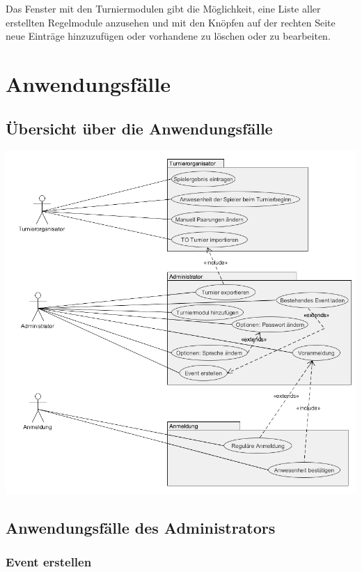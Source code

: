 \documentclass[11pt]{article}
\begin{document}
\vspace{1cm}

Das Fenster mit den Turniermodulen gibt die Möglichkeit, eine Liste aller erstellten Regelmodule anzusehen und mit den Knöpfen auf der rechten Seite neue Einträge hinzuzufügen oder vorhandene zu löschen oder zu bearbeiten.

\section{Anwendungsfälle}

\subsection{Übersicht über die Anwendungsfälle}

\includegraphics[width=\textwidth]{UseCaseDiagram.png}

\subsection{Anwendungsfälle des Administrators}

\subsubsection{Event erstellen}
\end{document}

